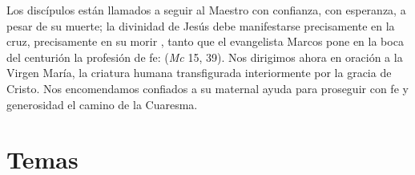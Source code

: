 \begin{body}
Los discípulos están llamados a seguir al Maestro con confianza, con esperanza, a pesar de su muerte; la divinidad de Jesús debe manifestarse precisamente en la cruz, precisamente en su morir , tanto que el evangelista Marcos pone en la boca del centurión la profesión de fe:  (\textit{Mc} 15, 39). Nos dirigimos ahora en oración a la Virgen María, la criatura humana transfigurada interiormente por la gracia de Cristo. Nos encomendamos confiados a su maternal ayuda para proseguir con fe y generosidad el camino de la Cuaresma.
\end{body}

\newsection
\section{Temas}


